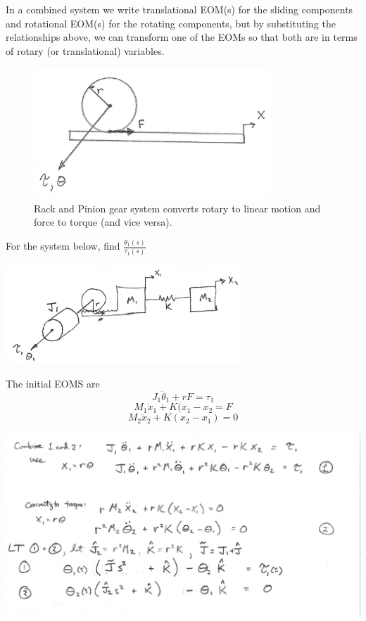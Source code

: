 In a combined system we write translational EOM(s) for the sliding components and rotational EOM(s) for the rotating components, but by substituting the relationships above, we can transform one of the EOMs so that both are in terms of rotary (or translational) variables. 

 


\begin{figure}\centering
\includegraphics[width=3.5in]{figs03/00755.png}
\caption{Rack and Pinion gear system converts rotary to linear motion and force to torque (and vice versa).}\label{rackpinion}
\end{figure}



\begin{Example}
For the system below, find  $\frac{\theta_1(s)}{\tau_1(s)}$

\includegraphics[width=3.5in]{figs03/00754.png}  

The initial EOMS are
\[
J_1\ddot{\theta}_1 + rF = \tau_1     
\]
\[
M_1\ddot{x}_1 + K(x_1-x_2 = F
\]
\[
M_2\ddot{x}_2+K(x_2-x_1)  = 0
\]

\includegraphics[width=6.0in]{figs03/00756a.png}  

\end{Example}

